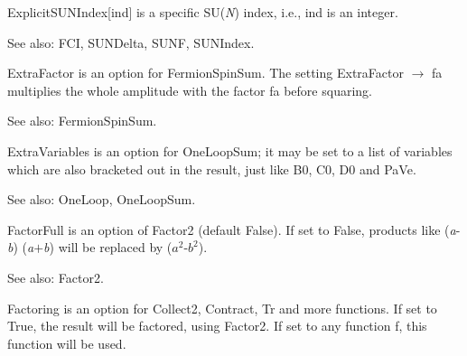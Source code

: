 



ExplicitSUNIndex[ind] is a specific SU({\itshape N}) index, i.e., ind is an integer.

See also: FCI, SUNDelta, SUNF, SUNIndex.








ExtraFactor is an option for FermionSpinSum. The setting ExtraFactor \(\rightarrow \) fa { }multiplies the whole amplitude with the
  factor fa before squaring.

See also: FermionSpinSum.



ExtraVariables is an option for OneLoopSum; it may be set to a list of variables which are also bracketed out in the result, just like
  B0, C0, D0 and { }PaVe.

See also:  OneLoop, OneLoopSum.



FactorFull is an option of Factor2 (default False). If set to False, products like ({\itshape a}-{\itshape b}) ({\itshape a}\(+\){\itshape b}) will
be replaced by (\({a^2}\)-\({b^2}\)).

See also:  Factor2.



Factoring is an option for Collect2, Contract, Tr and more functions. If set to True, the result will be factored, using Factor2. If set
  to any function f, this function will be used.

